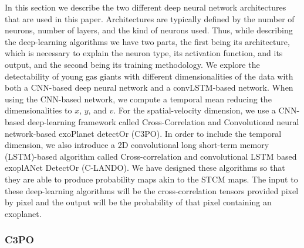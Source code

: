 \documentclass{aa}
\newcommand{\newchange}[1]{\textcolor{black}{#1}}
\begin{document}
In this section we describe the two different deep neural network architectures that are used in this paper.
Architectures are typically defined by the number of neurons, number of layers, and the kind of neurons used.
Thus, while describing the deep-learning algorithms we have two parts, the first being its architecture, which is necessary to explain the neuron type, its activation function, and its output, and the second being its training methodology.
We explore the detectability of \newchange{young gas giant}s with different dimensionalities of the data with both a CNN-based deep neural network and a convLSTM-based network.
When using the CNN-based network, we compute a temporal mean reducing the dimensionalities to $x$, $y$, and $v$.
For the spatial-velocity dimension, we use a CNN-based deep-learning framework called Cross-Correlation and Convolutional neural network-based exoPlanet detectOr (C3PO).
In order to include the temporal dimension, we also introduce a 2D convolutional long short-term memory (LSTM)-based algorithm called Cross-correlation and convolutional LSTM based exoplANet DetectOr (C-LANDO).
We have designed these algorithms so that they are able to produce probability maps akin to the STCM maps. 
The input to these deep-learning algorithms will be the cross-correlation tensors provided pixel by pixel and the output will be the probability of that pixel containing an exoplanet. %

\subsubsection{C3PO}
\end{document}
